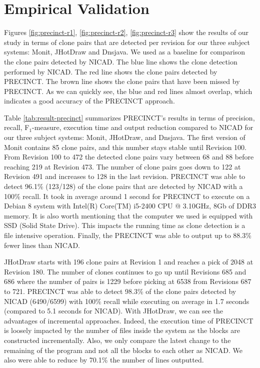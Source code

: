 \documentclass[12pt]{report}
\begin{document}
\section{\texorpdfstring{Empirical Validation
\label{sec:precinct-experimentations}}{Empirical Validation }}\label{empirical-validation-1}



Figures \ref{fig:precinct-r1}, \ref{fig:precinct-r2},
\ref{fig:precinct-r3} show the results of our study in terms of clone
pairs that are detected per revision for our three subject systems:
Monit, JHotDraw and Dnsjava. We used as a baseline for comparison the
clone pairs detected by NICAD. The blue line shows the clone detection
performed by NICAD. The red line shows the clone pairs detected by
PRECINCT. The brown line shows the clone pairs that have been missed by
PRECINCT. As we can quickly see, the blue and red lines almost overlap,
which indicates a good accuracy of the PRECINCT approach.



Table \ref{tab:result-precinct} summarizes PRECINCT's results in terms
of precision, recall, F\(_{1}\)-measure, execution time and output
reduction compared to NICAD for our three subject systems: Monit,
JHotDraw, and Dnsjava. The first version of Monit contains 85 clone
pairs, and this number stays stable until Revision 100. From Revision
100 to 472 the detected clone pairs vary between 68 and 88 before
reaching 219 at Revision 473. The number of clone pairs goes down to 122
at Revision 491 and increases to 128 in the last revision. PRECINCT was
able to detect 96.1\% (123/128) of the clone pairs that are detected by
NICAD with a 100\% recall. It took in average around 1 second for
PRECINCT to execute on a Debian 8 system with Intel(R) Core(TM) i5-2400
CPU @ 3.10GHz, 8Gb of DDR3 memory. It is also worth mentioning that the
computer we used is equipped with SSD (Solid State Drive). This impacts
the running time as clone detection is a file intensive operation.
Finally, the PRECINCT was able to output up to 88.3\% fewer lines than
NICAD.

JHotDraw starts with 196 clone pairs at Revision 1 and reaches a pick of
2048 at Revision 180. The number of clones continues to go up until
Revisions 685 and 686 where the number of pairs is 1229 before picking
at 6538 from Revisions 687 to 721. PRECINCT was able to detect 98.3\% of
the clone pairs detected by NICAD (6490/6599) with 100\% recall while
executing on average in 1.7 seconds (compared to 5.1 seconds for NICAD).
With JHotDraw, we can see the advantages of incremental approaches.
Indeed, the execution time of PRECINCT is loosely impacted by the number
of files inside the system as the blocks are constructed incrementally.
Also, we only compare the latest change to the remaining of the program
and not all the blocks to each other as NICAD. We also were able to
reduce by 70.1\% the number of lines outputted.
\end{document}
